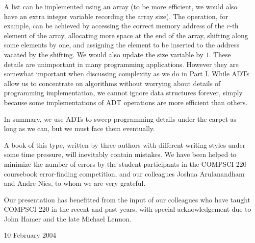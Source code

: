 A list can be implemented using an array (to be more efficient, we
would also have an extra integer variable recording the array size). The
 operation, for example, can be achieved by accessing
the correct memory address of the $r$-th element of the array, allocating
more space at the end of the array, shifting along some elements by one,
and assigning the element to be inserted to the address vacated by the
shifting. We would also update the size variable by $1$. These details
are unimportant in many programming applications. However they are
somewhat important when discussing complexity as we do in Part I. While
ADTs allow us to concentrate on algorithms without worrying about details
of programming implementation, we cannot ignore data structures forever,
simply because some implementations of ADT operations are more efficient
than others.

In summary, we use ADTs to sweep programming details under the carpet
as long as we can, but we must face them eventually.

A book of this type, written by three authors with different
writing styles under some time pressure, will inevitably
contain mistakes. We have been helped to minimize the number of
errors by the student participants in the COMPSCI 220 coursebook
error-finding competition, and our colleagues Joshua Arulanandham 
and Andre Nies, to whom we are very grateful. 

Our presentation has benefitted from the input of 
our colleagues who have taught COMPSCI 220 
in the recent and past years, with special acknowledgement 
due to John Hamer and the late Michael Lennon.





\bigskip

\begin{flushright}



10 February 2004
\end{flushright}

